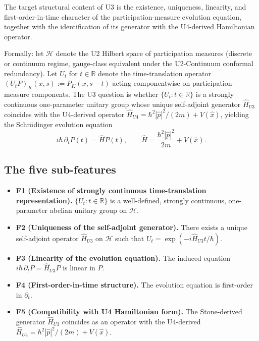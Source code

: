 \documentclass[11pt,a4paper]{article}
\begin{document}
The target structural content of U3 is the existence, uniqueness, linearity, and first-order-in-time character of the participation-measure evolution equation, together with the identification of its generator with the U4-derived Hamiltonian operator.

Formally: let $\mathcal{H}$ denote the U2 Hilbert space of participation measures (discrete or continuum regime, gauge-class equivalent under the U2-Continuum conformal redundancy). Let $U_t$ for $t \in \mathbb{R}$ denote the time-translation operator $(U_t P)_K(x, s) := P_K(x, s - t)$ acting componentwise on participation-measure components. The U3 question is whether $\{U_t : t \in \mathbb{R}\}$ is a strongly continuous one-parameter unitary group whose unique self-adjoint generator $\hat{H}_{U3}$ coincides with the U4-derived operator $\hat{H}_{U4} = \hbar^2|\hat{p}|^2/(2m) + V(\hat{x})$, yielding the Schr\"odinger evolution equation
\begin{equation}
i\hbar \, \partial_t P(t) = \hat{H} P(t), \qquad \hat{H} = \frac{\hbar^2|\hat{p}|^2}{2m} + V(\hat{x}). \label{eq:U3target}
\end{equation}

\subsection{The five sub-features}

\begin{itemize}
  \item \textbf{F1 (Existence of strongly continuous time-translation representation).} $\{U_t : t \in \mathbb{R}\}$ is a well-defined, strongly continuous, one-parameter abelian unitary group on $\mathcal{H}$.
  \item \textbf{F2 (Uniqueness of the self-adjoint generator).} There exists a unique self-adjoint operator $\hat{H}_{U3}$ on $\mathcal{H}$ such that $U_t = \exp(-i\hat{H}_{U3} t/\hbar)$.
  \item \textbf{F3 (Linearity of the evolution equation).} The induced equation $i\hbar \, \partial_t P = \hat{H}_{U3} P$ is linear in $P$.
  \item \textbf{F4 (First-order-in-time structure).} The evolution equation is first-order in $\partial_t$.
  \item \textbf{F5 (Compatibility with U4 Hamiltonian form).} The Stone-derived generator $\hat{H}_{U3}$ coincides as an operator with the U4-derived $\hat{H}_{U4} = \hbar^2|\hat{p}|^2/(2m) + V(\hat{x})$.
\end{itemize}
\end{document}
